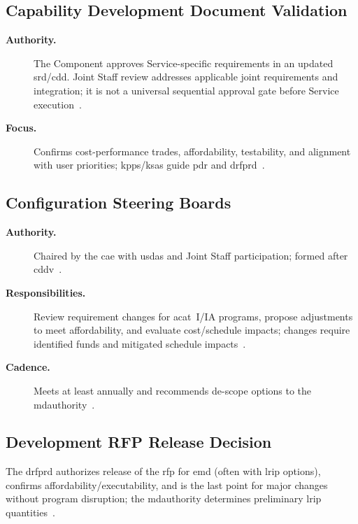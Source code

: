 \documentclass[../main.tex]{subfiles}
\begin{document}
\subsection{Capability Development Document Validation}
\begin{description}
  \item[\textbf{Authority.}] The Component approves Service-specific requirements in an updated \ac{srd}/\ac{cdd}. Joint Staff review addresses applicable joint requirements and integration; it is not a universal sequential approval gate before Service execution~\autocite{edo-3-3-3-jfrp-2026,edo-3-3-2-acq-milestones-phases-2025}.
  \item[\textbf{Focus.}] Confirms cost-performance trades, affordability, testability, and alignment with user priorities; \acp{kpp}/\acp{ksa} guide \ac{pdr} and \ac{drfprd}~\autocite{DoDI5000-85,CJCSM5123-01,DAU-Performance-Attributes,edo-3-3-2-acq-milestones-phases-2025}.
\end{description}

\subsection{Configuration Steering Boards}
\begin{description}
  \item[\textbf{Authority.}] Chaired by the \ac{cae} with \ac{usdas} and Joint Staff participation; formed after \ac{cddv}~\autocite{DoDI5000-85,edo-3-3-2-acq-milestones-phases-2025}.
  \item[\textbf{Responsibilities.}] Review requirement changes for \ac{acat}~I/IA programs, propose adjustments to meet affordability, and evaluate cost/schedule impacts; changes require identified funds and mitigated schedule impacts~\autocite{DoDI5000-85,edo-3-3-2-acq-milestones-phases-2025}.
  \item[\textbf{Cadence.}] Meets at least annually and recommends de-scope options to the \ac{mdauthority}~\autocite{DoDI5000-85,edo-3-3-2-acq-milestones-phases-2025}.
\end{description}

\subsection{Development RFP Release Decision}
The \ac{drfprd} authorizes release of the \ac{rfp} for \ac{emd} (often with \ac{lrip} options), confirms affordability/executability, and is the last point for major changes without program disruption; the \ac{mdauthority} determines preliminary \ac{lrip} quantities~\autocite{DoDI5000-85,edo-3-3-2-acq-milestones-phases-2025}.
\end{document}
